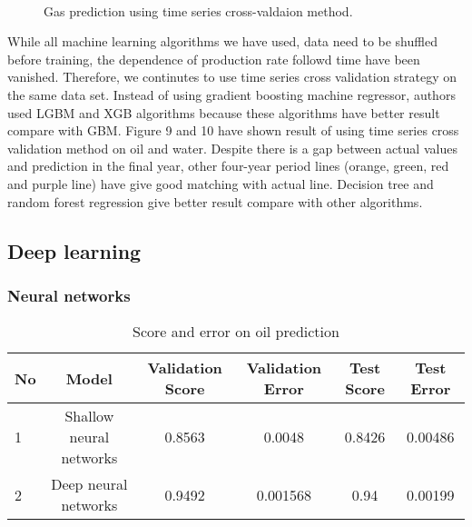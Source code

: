 \documentclass[english]{article}
\makeatletter
\def\maxwidth{\ifdim\Gin@nat@width>\linewidth\linewidth
    \else\Gin@nat@width\fi}
\let\Oldincludegraphics\includegraphics
\renewcommand{\includegraphics}[1]{\Oldincludegraphics[width=.8\maxwidth]{#1}}
\makeatother
\begin{document}
\begin{figure}[H]
     \begin{center}
%
        \\ %
    \end{center}
    \caption{%
        Gas prediction using time series cross-valdaion method.
     }%
   \label{fig:subfigures}
\end{figure}
While all machine learning algorithms we have used, data need to be shuffled before training, the dependence of production rate followd time have been vanished. Therefore, we continutes to use time series cross validation strategy on the same data set. Instead of using gradient boosting machine regressor, authors used LGBM and XGB algorithms because these algorithms have better result compare with GBM. Figure 9 and 10 have shown result of using time series cross validation method on oil and water. Despite there is a gap between actual values and prediction in the final year, other four-year period lines (orange, green, red and purple line) have give good matching with actual line. Decision tree and random forest regression give better result compare with other algorithms.


\subsection{Deep learning}
\subsubsection{Neural networks}
\begin{table}[H]
\caption{Score and error on oil prediction}
\begin{tabular}{|l|c|c|c|c|c|}
\hline
\textbf{No} & \textbf{Model}          & \textbf{Validation Score} & \textbf{Validation Error} & \textbf{Test Score} & \textbf{Test Error}  \\ \hline
1           & Shallow neural networks & 0.8563                        & 0.0048                    & 0.8426                  & 0.00486                                     \\ \hline
2           & Deep neural networks    & 0.9492                        & 0.001568                  & 0.94                    & 0.00199                                    \\ \hline
\end{tabular}
\end{table}
\end{document}
